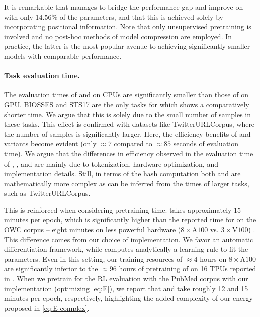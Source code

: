 \par
It is remarkable that \methodname manages to bridge the performance gap and improve on \bert with only 14.56\% of the parameters, and that this is achieved solely by incorporating positional information.
Note that only unsupervised pretraining is involved and no post-hoc methods of model compression \cite{compression} are employed.
In practice, the latter is the most popular avenue to achieving significantly smaller models with comparable performance.

\paragraph{Task evaluation time.}
The evaluation times of \flyvec and \methodname on CPUs are significantly smaller than those of \bert on GPU.
BIOSSES and STS17 are the only tasks for which \bert shows a comparatively shorter time.
We argue that this is solely due to the small number of samples in these tasks. 
This effect is confirmed with datasets like TwitterURLCorpus, where the number of samples is significantly larger.
Here, the efficiency benefits of \flyvec and \methodname variants become evident (only ${\approx}7$ compared to ${\approx}85$ seconds of evaluation time).
We argue that the differences in efficiency observed in the evaluation time of \flyvec, \methodname, and \methodnametwo are mainly due to tokenization, hardware optimization, and implementation details.
Still, in terms of the hash computation both \methodname and \methodnametwo are mathematically more complex as can be inferred from the times of larger tasks, such as TwitterURLCorpus.

\par
This is reinforced when considering pretraining time.
\methodname takes approximately 15 minutes per epoch, which is significantly higher than the reported time for \flyvec on the OWC corpus -- eight minutes on less powerful hardware ($8\times\text{A100}$ vs. $3\times\text{V100}$) \cite{flyvec}.
This difference comes from our choice of implementation.
We favor an automatic differentiation framework, while \cite{flyvec} computes analytically a learning rule to fit the parameters.
Even in this setting, our training resources of ${\approx}4$ hours on $8\times\text{A100}$ are significantly inferior to the ${\approx}96$ hours of pretraining of \bert on 16 TPUs reported in \cite{bert}. 
When we pretrain \pflyvec for the RL evaluation with the PubMed corpus with our implementation (optimizing \cref{eq:E}), we report that \pflyvec and \methodname take roughly 12 and 15 minutes per epoch, respectively, highlighting the added complexity of our energy proposed in \cref{eq:E-complex}.

